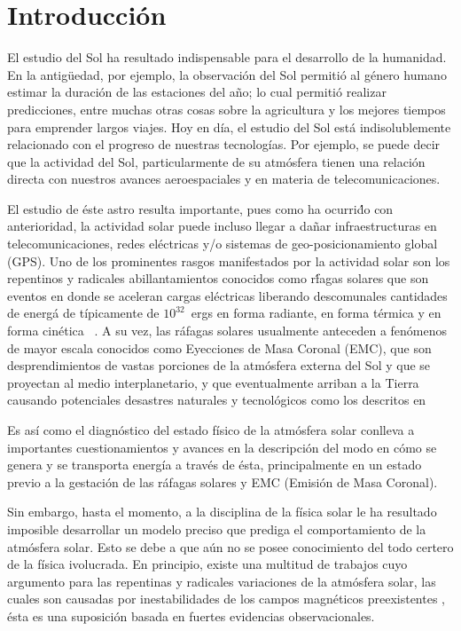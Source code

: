 \chapter{Introducci\'on}


El estudio del Sol ha resultado indispensable para el desarrollo de la humanidad. En la antig\"uedad, por ejemplo, la observaci\'on del Sol permiti\'o al g\'enero humano estimar la duraci\'on de las estaciones del a\~no; lo cual permiti\'o realizar predicciones, entre muchas otras cosas sobre la agricultura y los mejores tiempos para emprender largos viajes. Hoy en d\'ia, el estudio del Sol est\'a indisolublemente relacionado con el progreso de nuestras tecnolog\'ias. Por ejemplo, se puede decir que la actividad del Sol, particularmente de su atm\'osfera tienen una relaci\'on directa con nuestros avances aeroespaciales y en materia de telecomunicaciones.

El estudio de \'este astro resulta importante, pues como ha ocurri\'do con anterioridad, la actividad solar puede incluso llegar a da\~nar infraestructuras en telecomunicaciones, redes el\'ectricas y/o sistemas de geo-posicionamiento global (GPS)\citep{carrington}. Uno de los prominentes rasgos manifestados por la actividad solar son los repentinos y radicales abillantamientos conocidos como r\'fagas solares que son eventos en donde se aceleran cargas el\'ectricas liberando descomunales cantidades de energ\'a de t\'ipicamente de $10^{32}$~ergs en forma radiante, en forma t\'ermica y en forma cin\'etica ~\citep{carrington}. A su vez, las r\'afagas solares usualmente anteceden a fen\'omenos de mayor escala conocidos como Eyecciones de Masa Coronal (EMC), que son desprendimientos de vastas porciones de la atm\'osfera externa del Sol y que se proyectan al medio interplanetario, y que eventualmente arriban a la Tierra causando potenciales desastres naturales y tecnol\'ogicos como los descritos en~\citep{carrington}

Es as\'i como el diagn\'ostico del estado f\'isico de la atm\'osfera solar conlleva a importantes cuestionamientos y avances en la descripci\'on del modo en c\'omo se genera y se transporta energ\'ia a trav\'es de \'esta, principalmente en un estado previo a la gestaci\'on de las r\'afagas solares y EMC (Emisi\'on de Masa Coronal).

Sin embargo, hasta el momento, a la disciplina de la f\'isica solar le ha resultado imposible desarrollar un modelo preciso que prediga el comportamiento de la atm\'osfera solar. Esto se debe a que a\'un no se posee conocimiento del todo certero de la f\'isica ivolucrada. En principio, existe una multitud de trabajos cuyo argumento para las repentinas y radicales variaciones de la atm\'osfera solar, las cuales son causadas por inestabilidades de los campos magn\'eticos preexistentes \citep{chromotemp}, \'esta es una suposici\'on basada en fuertes evidencias observacionales. 

